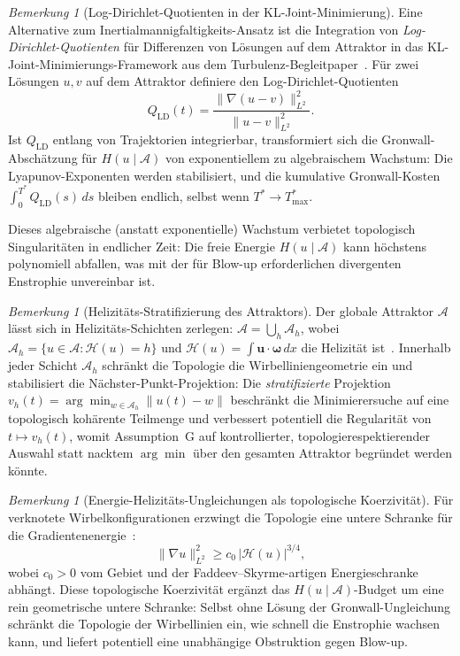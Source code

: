 \documentclass[12pt,a4paper]{article}
\theoremstyle{definition}
\theoremstyle{plain}
\theoremstyle{remark}
\newtheorem{remark}[definition]{Bemerkung}
\begin{document}
\begin{remark}[Log-Dirichlet-Quotienten in der KL-Joint-Minimierung]
\label{rem:log-dirichlet}
Eine Alternative zum Inertialmannigfaltigkeits-Ansatz ist die Integration
von \emph{Log-Dirichlet-Quotienten} für Differenzen von Lösungen auf
dem Attraktor in das KL-Joint-Minimierungs-Framework aus dem
Turbulenz-Begleitpaper~\cite{FST-TU2026}. Für zwei Lösungen $u, v$
auf dem Attraktor definiere den Log-Dirichlet-Quotienten
\[
  Q_{\mathrm{LD}}(t)
  = \frac{\|\nabla(u - v)\|_{L^2}^2}{\|u - v\|_{L^2}^2}.
\]
Ist $Q_{\mathrm{LD}}$ entlang von Trajektorien integrierbar, transformiert
sich die Gronwall-Abschätzung für $H(u \mid \mathcal{A})$ von
exponentiellem zu algebraischem Wachstum: Die Lyapunov-Exponenten werden
stabilisiert, und die kumulative Gronwall-Kosten
$\int_0^{T^*} Q_{\mathrm{LD}}(s)\, ds$ bleiben endlich, selbst wenn
$T^* \to T^*_{\max}$.

Dieses algebraische (anstatt exponentielle) Wachstum verbietet
topologisch Singularitäten in endlicher Zeit: Die freie Energie
$H(u \mid \mathcal{A})$ kann höchstens polynomiell abfallen, was mit
der für Blow-up erforderlichen divergenten Enstrophie unvereinbar ist.
\end{remark}

\begin{remark}[Helizitäts-Stratifizierung des Attraktors]
\label{rem:helicity-stratification}
Der globale Attraktor $\mathcal{A}$ lässt sich in
Helizitäts-Schichten zerlegen:
$\mathcal{A} = \bigcup_h \mathcal{A}_h$, wobei
$\mathcal{A}_h = \{ u \in \mathcal{A} : \mathcal{H}(u) = h \}$ und
$\mathcal{H}(u) = \int \mathbf{u} \cdot \boldsymbol{\omega}\, dx$
die Helizität ist~\cite{Moffatt69, ArnoldKhesin98}. Innerhalb jeder
Schicht $\mathcal{A}_h$ schränkt die Topologie die
Wirbelliniengeometrie ein und stabilisiert die
Nächster-Punkt-Projektion: Die \emph{stratifizierte} Projektion
$v_h(t) = \arg\min_{w \in \mathcal{A}_h} \|u(t) - w\|$ beschränkt
die Minimierersuche auf eine topologisch kohärente Teilmenge und
verbessert potentiell die Regularität von $t \mapsto v_h(t)$, womit
Assumption~G auf kontrollierter, topologierespektierender Auswahl
statt nacktem $\arg\min$ über den gesamten Attraktor begründet
werden könnte.
\end{remark}

\begin{remark}[Energie-Helizitäts-Ungleichungen als topologische
Koerzivität]
\label{rem:helicity-energy-bounds}
Für verknotete Wirbelkonfigurationen erzwingt die Topologie eine
untere Schranke für die Gradientenenergie~\cite{ArnoldKhesin98}:
\[
  \|\nabla u\|_{L^2}^2 \geq c_0 \, |\mathcal{H}(u)|^{3/4},
\]
wobei $c_0 > 0$ vom Gebiet und der Faddeev--Skyrme-artigen
Energieschranke abhängt. Diese topologische Koerzivität ergänzt
das $H(u \mid \mathcal{A})$-Budget um eine rein geometrische untere
Schranke: Selbst ohne Lösung der Gronwall-Ungleichung schränkt die
Topologie der Wirbellinien ein, wie schnell die Enstrophie wachsen
kann, und liefert potentiell eine unabhängige Obstruktion gegen
Blow-up.
\end{remark}
\end{document}
